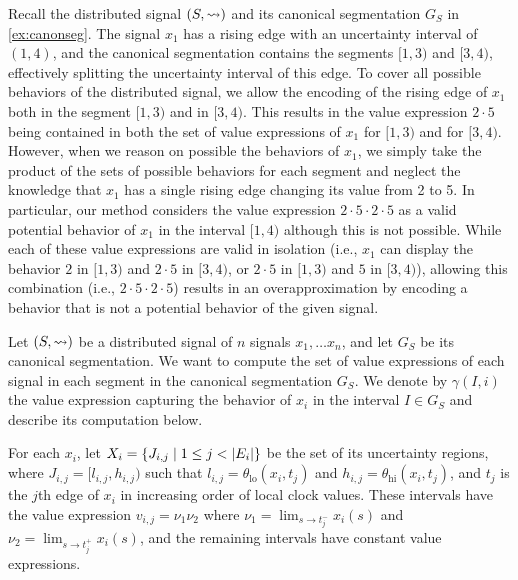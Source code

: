 \begin{example}
	Recall the distributed signal $(S, {\rightsquigarrow})$ and its canonical segmentation $G_S$ in \cref{ex:canonseg}.
	The signal $x_1$ has a rising edge with an uncertainty interval of $(1,4)$, and the canonical segmentation contains the segments $[1,3)$ and $[3,4)$, effectively splitting the uncertainty interval of this edge.
	To cover all possible behaviors of the distributed signal, we allow the encoding of the rising edge of $x_1$ both in the segment $[1,3)$ and in $[3,4)$.
	This results in the value expression $2 \cdot 5$ being contained in both the set of value expressions of $x_1$ for $[1,3)$ and for $[3,4)$.
	However, when we reason on possible the behaviors of $x_1$, we simply take the product of the sets of possible behaviors for each segment and neglect the knowledge that $x_1$ has a single rising edge changing its value from 2 to 5.
	In particular, our method considers the value expression $2 \cdot 5 \cdot 2 \cdot 5$ as a valid potential behavior of $x_1$ in the interval $[1,4)$ although this is not possible.
	While each of these value expressions are valid in isolation (i.e., $x_1$ can display the behavior $2$ in $[1,3)$ and $2 \cdot 5$ in $[3,4)$, or $2 \cdot 5$ in $[1,3)$ and $5$ in $[3,4)$), allowing this combination (i.e., $2 \cdot 5 \cdot 2 \cdot 5$) results in an overapproximation by encoding a behavior that is not a potential behavior of the given signal.
\end{example}

Let $(S,{\rightsquigarrow})$ be a distributed signal of $n$ signals $x_1, \ldots x_n$, and let $G_S$ be its canonical segmentation.
We want to compute the set of value expressions of each signal in each segment in the canonical segmentation $G_S$.
We denote by $\gamma(I, i)$ the value expression capturing the behavior of $x_i$ in the interval $I \in G_S$ and describe its computation below.

For each $x_i$, let $X_i = \{ J_{i,j} \st 1 \leq j < |E_i| \}$ be the set of its uncertainty regions, where $J_{i,j} = [l_{i,j}, h_{i,j})$ such that $l_{i,j} = \theta_{\text{lo}}(x_i, t_j)$ and $h_{i,j} = \theta_{\text{hi}}(x_i, t_j)$, and $t_j$ is the $j$th edge of $x_i$ in increasing order of local clock values.
These intervals have the value expression $v_{i,j} = \nu_1 \nu_2$ where $\nu_1 = \lim_{s \to t_j^-} x_i(s)$ and $\nu_2 = \lim_{s \to t_j^+} x_i(s)$, and the remaining intervals have constant value expressions.


